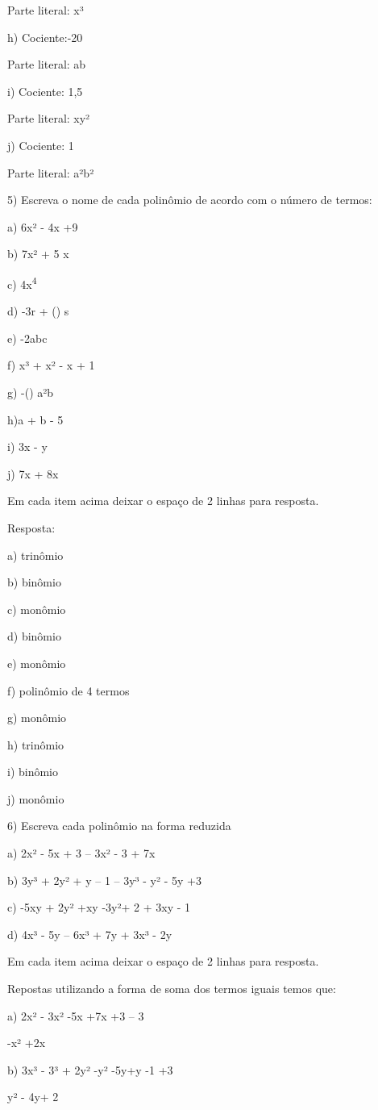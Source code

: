 Parte literal: x³

h) Cociente:-20

Parte literal: ab

i) Cociente: 1,5

Parte literal: xy²

j) Cociente: 1

Parte literal: a²b²

5) Escreva o nome de cada polinômio de acordo com o número de termos:

a) 6x² - 4x +9

b) 7x² + 5 x

c) 4x\textsuperscript{4}

d) -3r + () s

e) -2abc

f) x³ + x² - x + 1

g) -() a²b

h)a + b - 5

i) 3x - y

j) 7x + 8x

Em cada item acima deixar o espaço de 2 linhas para resposta.

Resposta:

a) trinômio

b) binômio

c) monômio

d) binômio

e) monômio

f) polinômio de 4 termos

g) monômio

h) trinômio

i) binômio

j) monômio

6) Escreva cada polinômio na forma reduzida

a) 2x² - 5x + 3 -- 3x² - 3 + 7x

b) 3y³ + 2y² + y -- 1 -- 3y³ - y² - 5y +3

c) -5xy + 2y² +xy -3y²+ 2 + 3xy - 1

d) 4x³ - 5y -- 6x³ + 7y + 3x³ - 2y

Em cada item acima deixar o espaço de 2 linhas para resposta.

Repostas utilizando a forma de soma dos termos iguais temos que:

a) 2x² - 3x² -5x +7x +3 -- 3

-x² +2x

b) 3x³ - 3³ + 2y² -y² -5y+y -1 +3

y² - 4y+ 2


